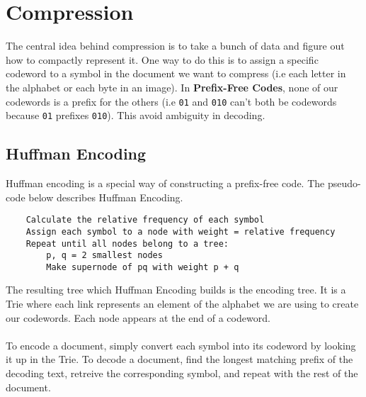 \documentclass{article}
\begin{document}
\section{Compression}
The central idea behind compression is to take a bunch of data and figure out how to compactly represent it.
One way to do this is to assign a specific codeword to a symbol in the document we want to compress (i.e each letter in the alphabet or each byte in an image).
In \textbf{Prefix-Free Codes}, none of our codewords is a prefix for the others (i.e \lstinline{01} and \lstinline{010} can't both be codewords because \lstinline{01} prefixes \lstinline{010}). This avoid ambiguity in decoding.
\subsection{Huffman Encoding}
Huffman encoding is a special way of constructing a prefix-free code.
The pseudo-code below describes Huffman Encoding.
\begin{lstlisting}
    Calculate the relative frequency of each symbol
    Assign each symbol to a node with weight = relative frequency
    Repeat until all nodes belong to a tree:
        p, q = 2 smallest nodes
        Make supernode of pq with weight p + q
\end{lstlisting}
The resulting tree which Huffman Encoding builds is the encoding tree.
It is a Trie where each link represents an element of the alphabet we are using to create our codewords.
Each node appears at the end of a codeword.
\\\\
To encode a document, simply convert each symbol into its codeword by looking it up in the Trie.
To decode a document, find the longest matching prefix of the decoding text, retreive the corresponding symbol,
and repeat with the rest of the document.
\end{document}
